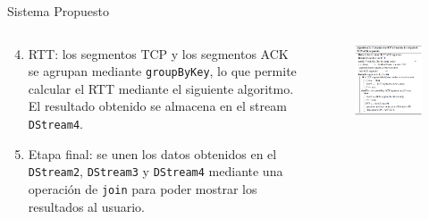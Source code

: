 \documentclass[aspectratio=149]{beamer}
\begin{document}
\begin{frame}{Sistema Propuesto}
    \begin{columns}
    \begin{column}{0.6\textwidth}
        \begin{enumerate}
            \setcounter{enumi}{3}
            \item RTT: los segmentos TCP y los segmentos ACK se agrupan mediante \texttt{groupByKey}, lo que permite calcular el RTT mediante el siguiente algoritmo. El resultado obtenido se almacena en el stream \texttt{DStream4}.
            \item Etapa final: se unen los datos obtenidos en el \texttt{DStream2}, \texttt{DStream3} y \texttt{DStream4} mediante una operación de \texttt{join} para poder mostrar los resultados al usuario.
        \end{enumerate}
    \end{column}
    \begin{column}{0.5\textwidth}
        \begin{figure}
            \centering
            \includegraphics[width=1.0\textwidth]{img/alg2.png}
            \label{fig:alg2}
        \end{figure}
    \end{column}
    \end{columns}
\end{frame}
\end{document}
